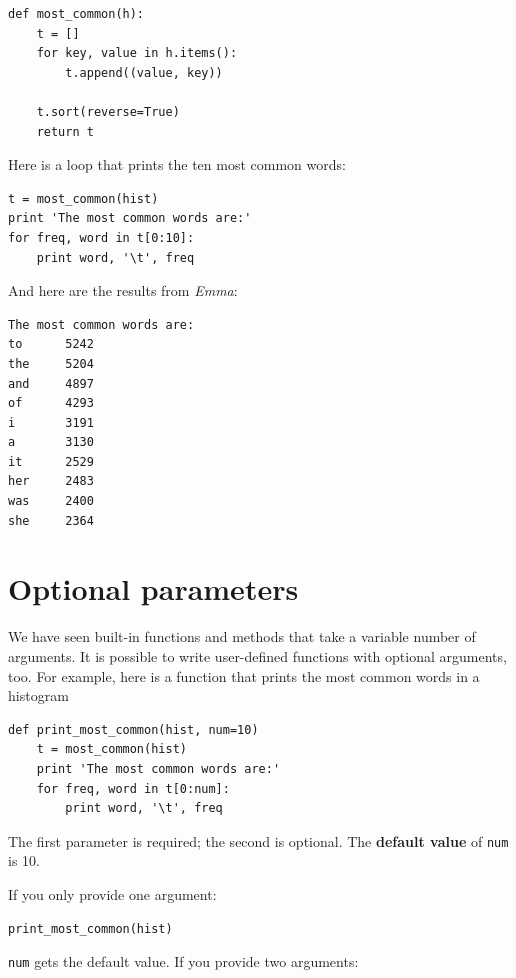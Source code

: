 \documentclass[10pt]{book}
\begin{document}
\beforeverb
\begin{verbatim}
def most_common(h):
    t = []
    for key, value in h.items():
        t.append((value, key))

    t.sort(reverse=True)
    return t
\end{verbatim}
\afterverb
%
Here is a loop that prints the ten most common words:

\beforeverb
\begin{verbatim}
t = most_common(hist)
print 'The most common words are:'
for freq, word in t[0:10]:
    print word, '\t', freq
\end{verbatim}
\afterverb
%
And here are the results from {\em Emma}:

\beforeverb
\begin{verbatim}
The most common words are:
to      5242
the     5204
and     4897
of      4293
i       3191
a       3130
it      2529
her     2483
was     2400
she     2364
\end{verbatim}
\afterverb
%

\section{Optional parameters}


We have seen built-in functions and methods that take a variable
number of arguments.  It is possible to write user-defined functions
with optional arguments, too.  For example, here is a function that
prints the most common words in a histogram

\beforeverb
\begin{verbatim}
def print_most_common(hist, num=10)
    t = most_common(hist)
    print 'The most common words are:'
    for freq, word in t[0:num]:
        print word, '\t', freq
\end{verbatim}
\afterverb

The first parameter is required; the second is optional.
The {\bf default value} of {\tt num} is 10.


If you only provide one argument:

\beforeverb
\begin{verbatim}
print_most_common(hist)
\end{verbatim}
\afterverb

{\tt num} gets the default value.  If you provide two arguments:
\end{document}

